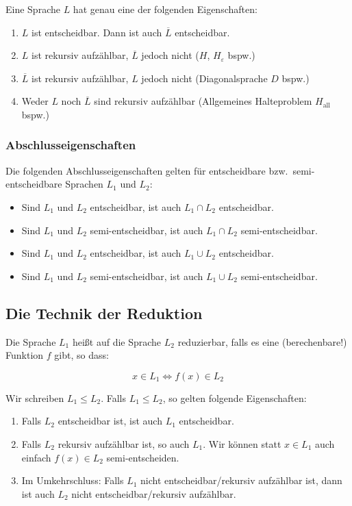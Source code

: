 \documentclass[a4paper,parskip=half*,DIV=7,fontsize=11pt]{scrartcl}
\newcommand\comp[1]{\overline#1}
\begin{document}
Eine Sprache $L$ hat genau eine der folgenden Eigenschaften:

\begin{enumerate}
\item  $L$ ist entscheidbar. Dann ist auch $\comp{L}$ entscheidbar.
\item $L$ ist rekursiv aufzählbar, $\comp{L}$ jedoch nicht ($H$, $H_\varepsilon$ bspw.)
\item $\comp{L}$ ist rekursiv aufzählbar, $L$ jedoch nicht (Diagonalsprache $D$ bspw.)
\item Weder $L$ noch $\comp{L}$ sind rekursiv aufzählbar (Allgemeines Halteproblem $H_\text{all}$ bspw.)
\end{enumerate}

\subsubsection{Abschlusseigenschaften}
Die folgenden Abschlusseigenschaften gelten für entscheidbare bzw.\ semi-entscheidbare Sprachen $L_1$ und $L_2$:
\begin{itemize}
\item Sind $L_1$ und $L_2$ entscheidbar, ist auch $L_1\cap L_2$ entscheidbar.
\item Sind $L_1$ und $L_2$ semi-entscheidbar, ist auch $L_1\cap L_2$ semi-entscheidbar.
\item Sind $L_1$ und $L_2$ entscheidbar, ist auch $L_1\cup L_2$ entscheidbar.
\item Sind $L_1$ und $L_2$ semi-entscheidbar, ist auch $L_1\cup L_2$ semi-entscheidbar.
\end{itemize}

\subsection{Die Technik der Reduktion}
\label{sec:reduktion}
Die Sprache $L_1$ heißt auf die Sprache $L_2$ reduzierbar, falls  es eine (berechenbare!) Funktion $f$ gibt, so dass:

\[x \in L_1 \iff f(x) \in L_2\]

Wir schreiben $L_1 \leq L_2$. Falls $L_1 \leq L_2$, so gelten folgende Eigenschaften:

\begin{enumerate}
\item Falls $L_2$ entscheidbar ist, ist auch $L_1$ entscheidbar.
\item  Falls $L_2$ rekursiv aufzählbar ist, so auch $L_1$. Wir können statt $x \in L_1$ auch einfach $f(x) \in L_2$ semi-entscheiden.
\item Im Umkehrschluss: Falls $L_1$ nicht entscheidbar/rekursiv aufzählbar ist, dann ist auch $L_2$ nicht entscheidbar/rekursiv aufzählbar.
\end{enumerate}
\end{document}
